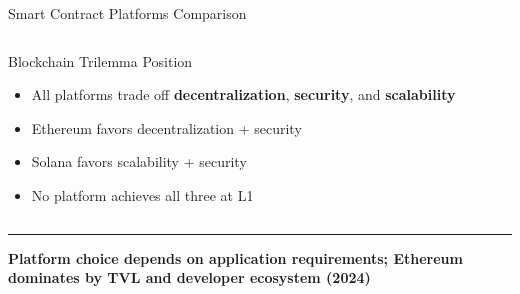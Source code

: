 \documentclass[8pt,aspectratio=169]{beamer}
\newcommand{\bottomnote}[1]{\vfill\vspace{-2mm}\textcolor{mllavender2}{\rule{\textwidth}{0.4pt}}\vspace{1mm}\footnotesize\textbf{#1}}
\begin{document}
\begin{frame}{Smart Contract Platforms Comparison}
\begin{columns}
\begin{block}{\textcolor{mlpurple}{Blockchain Trilemma Position}}
\begin{itemize}\small
  \item All platforms trade off \textbf{decentralization}, \textbf{security}, and \textbf{scalability}
  \item Ethereum favors decentralization + security
  \item Solana favors scalability + security
  \item No platform achieves all three at L1
\end{itemize}
\end{block}
\end{columns}
\bottomnote{Platform choice depends on application requirements; Ethereum dominates by TVL and developer ecosystem (2024)}
\end{frame}

\end{document}
